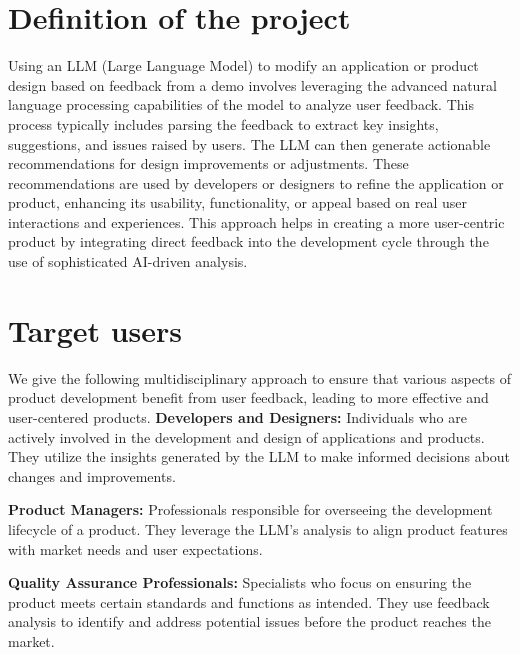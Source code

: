 \documentclass[journal,transmag]{IEEEtran}
\begin{document}
%
\IEEEpeerreviewmaketitle




\section{Definition of the project}
Using an LLM (Large Language Model) to modify an application or product design based on feedback from a demo involves leveraging the advanced natural language processing capabilities of the model to analyze user feedback. This process typically includes parsing the feedback to extract key insights, suggestions, and issues raised by users. The LLM can then generate actionable recommendations for design improvements or adjustments. These recommendations are used by developers or designers to refine the application or product, enhancing its usability, functionality, or appeal based on real user interactions and experiences. This approach helps in creating a more user-centric product by integrating direct feedback into the development cycle through the use of sophisticated AI-driven analysis.

\section{Target users}
We give the following multidisciplinary approach to ensure that various aspects of product development benefit from user feedback, leading to more effective and user-centered products.
\textbf{Developers and Designers:} Individuals who are actively involved in the development and design of applications and products. They utilize the insights generated by the LLM to make informed decisions about changes and improvements.

\textbf{Product Managers:} Professionals responsible for overseeing the development lifecycle of a product. They leverage the LLM’s analysis to align product features with market needs and user expectations.

\textbf{Quality Assurance Professionals:} Specialists who focus on ensuring the product meets certain standards and functions as intended. They use feedback analysis to identify and address potential issues before the product reaches the market.
\end{document}

